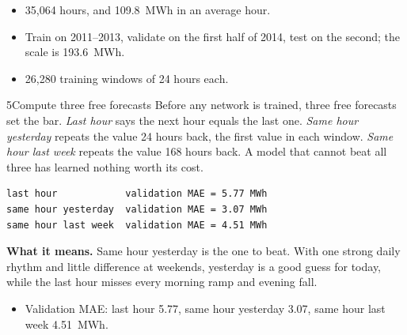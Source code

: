 \begin{labcheckpoint}
\begin{itemize}[leftmargin=1.2em,itemsep=2pt,topsep=1pt]
  \item 35,064 hours, and 109.8~MWh in an average hour.
  \item Train on 2011--2013, validate on the first half of 2014, test on the second; the scale is 193.6~MWh.
  \item 26,280 training windows of 24 hours each.
\end{itemize}
\end{labcheckpoint}


\begin{labquestion}{5}{Compute three free forecasts}
Before any network is trained, three free forecasts set the bar. \emph{Last hour} says the next hour equals the last one. \emph{Same hour yesterday} repeats the value 24 hours back, the first value in each window. \emph{Same hour last week} repeats the value 168 hours back. A model that cannot beat all three has learned nothing worth its cost.
\end{labquestion}
\begin{labanswer}

\begin{refoutput}
\begin{lstlisting}[style=utpterminal]
last hour            validation MAE = 5.77 MWh
same hour yesterday  validation MAE = 3.07 MWh
same hour last week  validation MAE = 4.51 MWh
\end{lstlisting}
\end{refoutput}

\textbf{What it means.} Same hour yesterday is the one to beat. With one strong daily rhythm and little difference at weekends, yesterday is a good guess for today, while the last hour misses every morning ramp and evening fall.
\end{labanswer}

\begin{labcheckpoint}
\begin{itemize}[leftmargin=1.2em,itemsep=2pt,topsep=1pt]
  \item Validation MAE: last hour 5.77, same hour yesterday 3.07, same hour last week 4.51~MWh.
\end{itemize}
\end{labcheckpoint}

